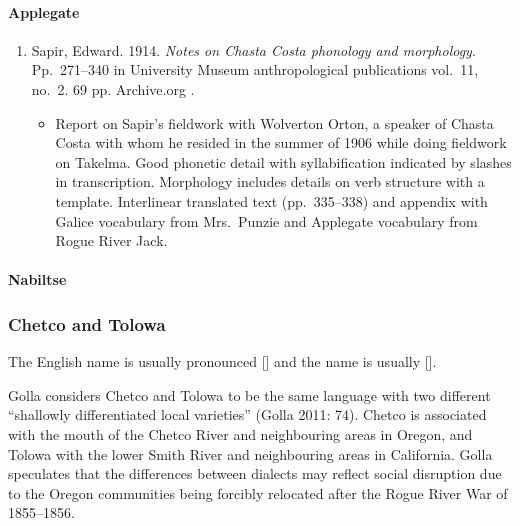 \documentclass[12pt,letterpaper,oneside,article]{memoir}
\begin{document}
\paragraph{Applegate}\label{sec:applegate}

\begin{enumerate}
\item	Sapir, Edward.
	1914.
	\textit{Notes on Chasta Costa phonology and morphology}.
	Pp.\ 271–340 in University Museum anthropological publications vol.\ 11, no.\ 2.
	69 pp.
	Archive.org .
	\begin{itemize}
	\item	Report on Sapir’s fieldwork with Wolverton Orton, a speaker of Chasta Costa
		with whom he resided in the summer of 1906 while doing fieldwork on Takelma.
		Good phonetic detail with syllabification indicated by slashes in transcription.
		Morphology includes details on verb structure with a template.
		Interlinear translated text (pp.\ 335–338) and appendix with Galice vocabulary
		from Mrs.\ Punzie and Applegate vocabulary from Rogue River Jack.
	\end{itemize}
\end{enumerate}

\paragraph{Nabiltse}\label{sec:nabiltse}

\subsubsection{Chetco and Tolowa}\label{sec:chetcotolowa}

The English name  is usually pronounced [] and the name  is usually [].

Golla considers Chetco and Tolowa to be the same language with two different “shallowly differentiated local varieties” (Golla 2011: 74).
Chetco is associated with the mouth of the Chetco River and neighbouring areas in Oregon, and Tolowa with the lower Smith River and neighbouring areas in California.
Golla speculates that the differences between dialects may reflect social disruption due to the Oregon communities being forcibly relocated after the Rogue River War of 1855–1856.
\end{document}
